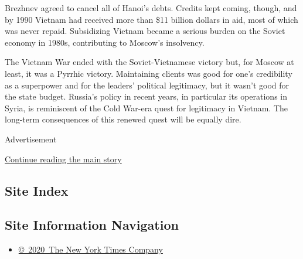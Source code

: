 Brezhnev agreed to cancel all of Hanoi's debts. Credits kept coming,
though, and by 1990 Vietnam had received more than \$11 billion dollars
in aid, most of which was never repaid. Subsidizing Vietnam became a
serious burden on the Soviet economy in 1980s, contributing to Moscow's
insolvency.

The Vietnam War ended with the Soviet-Vietnamese victory but, for Moscow
at least, it was a Pyrrhic victory. Maintaining clients was good for
one's credibility as a superpower and for the leaders' political
legitimacy, but it wasn't good for the state budget. Russia's policy in
recent years, in particular its operations in Syria, is reminiscent of
the Cold War-era quest for legitimacy in Vietnam. The long-term
consequences of this renewed quest will be equally dire.

Advertisement

\protect\hyperlink{after-bottom}{Continue reading the main story}

\hypertarget{site-index}{%
\subsection{Site Index}\label{site-index}}

\hypertarget{site-information-navigation}{%
\subsection{Site Information
Navigation}\label{site-information-navigation}}

\begin{itemize}
\tightlist
\item
  \href{https://help.nytimes3xbfgragh.onion/hc/en-us/articles/115014792127-Copyright-notice}{©~2020~The
  New York Times Company}
\end{itemize}

